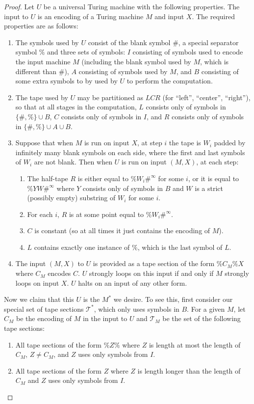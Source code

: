 \documentclass[10pt,a4paper]{amsart}
\newcommand{\Tc}{\mathcal{T}}
\begin{document}
\begin{proof}
Let $U$ be a universal Turing machine with the following properties. The input to $U$ is an encoding of a Turing machine $M$ and input $X$. The required properties are as follows:
\begin{enumerate}
    \item The symbols used by $U$ consist of the blank symbol $\#$, a special separator symbol $\%$ and three sets of symbols: $I$ consisting of symbols used to encode the input machine $M$ (including the blank symbol used by $M$, which is different than $\#$), $A$ consisting of symbols used by $M$, and $B$ consisting of some extra symbols to by used by $U$ to perform the computation.
    \item The tape used by $U$ may be partitioned as $LCR$ (for ``left'', ``center'', ``right''), so that at all stages in the computation, $L$ consists only of symbols in $\{\#,\%\}\cup B$, $C$ consists only of symbols in $I$, and $R$ consists only of symbols in $\{\#,\%\}\cup A\cup B$.
    \item Suppose that when $M$ is run on input $X$, at step $i$ the tape is $W_i$ padded by infinitely many blank symbols on each side, where the first and last symbols of $W_i$ are not blank. Then when $U$ is run on input $(M, X)$, at each step:
    \begin{enumerate}
        \item The half-tape $R$ is either equal to $\%W_i\#^\infty$ for some $i$, or it is equal to $\%YW\#^\infty$ where $Y$ consists only of symbols in $B$ and $W$ is a strict (possibly empty) substring of $W_i$ for some $i$.
        \item For each $i$, $R$ is at some point equal to $\%W_i\#^\infty$.
        \item $C$ is constant (so at all times it just contains the encoding of $M$).
        \item $L$ contains exactly one instance of $\%$, which is the last symbol of $L$.
    \end{enumerate}
    \item The input $(M, X)$ to $U$ is provided as a tape section of the form $\% C_M\% X$ where $C_M$ encodes $C$. $U$ strongly loops on this input if and only if $M$ strongly loops on input $X$. $U$ halts on an input of any other form.
\end{enumerate}

Now we claim that this $U$ is the $M^*$ we desire. To see this, first consider our special set of tape sections $\Tc^*$, which only uses symbols in $B$. For a given $M$, let $C_M$ be the encoding of $M$ in the input to $U$ and $\Tc_M$ be the set of the following tape sections:
\begin{enumerate}
    \item All tape sections of the form $\% Z\%$ where $Z$ is length at most the length of $C_M$, $Z\ne C_M$, and $Z$ uses only symbols from $I$.
    \item All tape sections of the form $Z$ where $Z$ is length longer than the length of $C_M$ and $Z$ uses only symbols from $I$.
\end{enumerate}


\end{proof}
\end{document}

